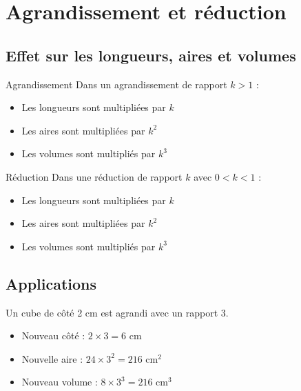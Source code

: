 \chapter{Agrandissement et réduction}

\section{Effet sur les longueurs, aires et volumes}
\begin{propriete}{Agrandissement}
Dans un agrandissement de rapport $k > 1$ :
\begin{itemize}
  \item Les longueurs sont multipliées par $k$
  \item Les aires sont multipliées par $k^2$
  \item Les volumes sont multipliés par $k^3$
\end{itemize}
\end{propriete}

\begin{propriete}{Réduction}
Dans une réduction de rapport $k$ avec $0 < k < 1$ :
\begin{itemize}
  \item Les longueurs sont multipliées par $k$
  \item Les aires sont multipliées par $k^2$
  \item Les volumes sont multipliés par $k^3$
\end{itemize}
\end{propriete}

\section{Applications}
\begin{exemple}
Un cube de côté 2 cm est agrandi avec un rapport 3.
\begin{itemize}
  \item Nouveau côté : $2 \times 3 = 6$ cm
  \item Nouvelle aire : $24 \times 3^2 = 216$ cm$^2$
  \item Nouveau volume : $8 \times 3^3 = 216$ cm$^3$
\end{itemize}
\end{exemple} 